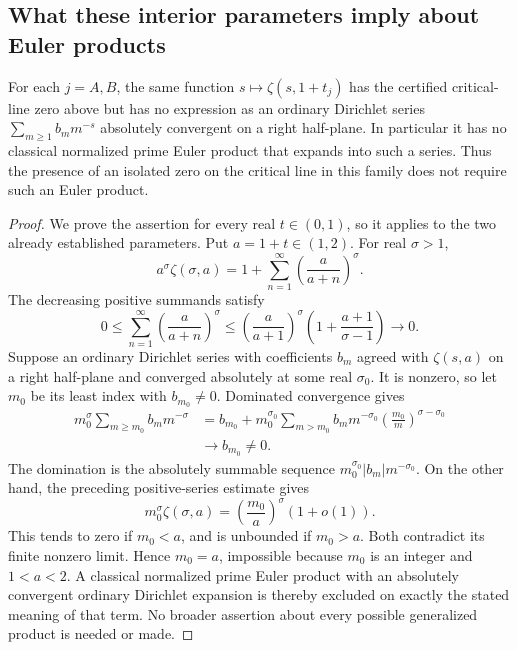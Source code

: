 \subsection{What these interior parameters imply about Euler products}

\begin{hxctheorem}\label{hxc:nonEuler}
For each \(j=A,B\), the same function
\(s\mapsto\zeta(s,1+t_j)\) has the certified critical-line zero above
but has no expression as an ordinary Dirichlet series
\(\sum_{m\ge1}b_m m^{-s}\) absolutely convergent on a right half-plane.
In particular it has no classical normalized prime Euler product that
expands into such a series. Thus the presence of an isolated zero on
the critical line in this family does not require such an Euler
product.
\end{hxctheorem}

\begin{proof}
We prove the assertion for every real \(t\in(0,1)\), so it applies to
the two already established parameters. Put \(a=1+t\in(1,2)\).
For real \(\sigma>1\),
\[
 a^\sigma\zeta(\sigma,a)
 =1+\sum_{n=1}^\infty\left(\frac a{a+n}\right)^\sigma.
\]
The decreasing positive summands satisfy
\[
 0\le\sum_{n=1}^\infty\left(\frac a{a+n}\right)^\sigma
 \le\left(\frac a{a+1}\right)^\sigma
    \left(1+\frac{a+1}{\sigma-1}\right)\longrightarrow0.
\]
Suppose an ordinary Dirichlet series with coefficients \(b_m\) agreed
with \(\zeta(s,a)\) on a right half-plane and converged absolutely at
some real \(\sigma_0\). It is nonzero, so let \(m_0\) be its least
index with \(b_{m_0}\ne0\). Dominated convergence gives
\begin{align*}
 m_0^\sigma\sum_{m\ge m_0}b_m m^{-\sigma}
 &=b_{m_0}+
 m_0^{\sigma_0}\sum_{m>m_0}b_m m^{-\sigma_0}
       \left(\frac{m_0}{m}\right)^{\sigma-\sigma_0}\\
 &\longrightarrow b_{m_0}\ne0.
\end{align*}
The domination is the absolutely summable sequence
\(m_0^{\sigma_0}|b_m|m^{-\sigma_0}\). On the other hand, the preceding
positive-series estimate gives
\[
 m_0^\sigma\zeta(\sigma,a)
 =\left(\frac{m_0}{a}\right)^\sigma(1+o(1)).
\]
This tends to zero if \(m_0<a\), and is unbounded if \(m_0>a\).
Both contradict its finite nonzero limit. Hence \(m_0=a\), impossible
because \(m_0\) is an integer and \(1<a<2\). A classical normalized
prime Euler product with an absolutely convergent ordinary Dirichlet
expansion is thereby excluded on exactly the stated meaning of that
term. No broader assertion about every possible generalized product
is needed or made.
\end{proof}


